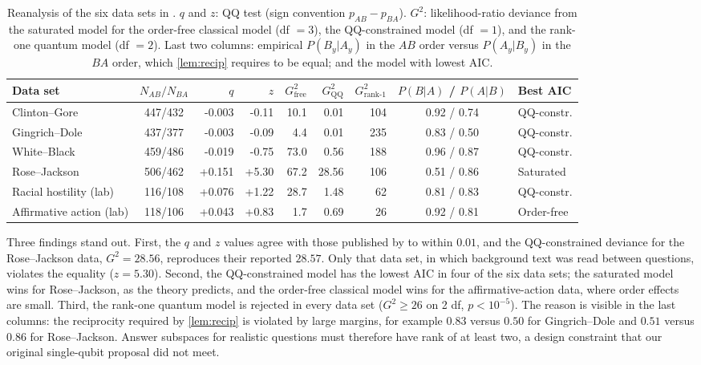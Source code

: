 \documentclass[11pt]{article}
\theoremstyle{definition}
\theoremstyle{remark}
\begin{document}
\begin{table}[t]
\centering
\caption{Reanalysis of the six data sets in \citet{wang2013}. $q$ and $z$: QQ test (sign convention $p_{AB}-p_{BA}$). $G^2$: likelihood-ratio deviance from the saturated model for the order-free classical model (df $=3$), the QQ-constrained model (df $=1$), and the rank-one quantum model (df $=2$). Last two columns: empirical $P(B_y|A_y)$ in the $AB$ order versus $P(A_y|B_y)$ in the $BA$ order, which \cref{lem:recip} requires to be equal; and the model with lowest AIC.}
\label{tab:qq}
\small
\begin{tabular}{lcrrrrrcl}
\toprule
Data set & $N_{AB}/N_{BA}$ & $q$ & $z$ & $G^2_{\text{free}}$ & $G^2_{\text{QQ}}$ & $G^2_{\text{rank-1}}$ & $P(B|A)$ / $P(A|B)$ & Best AIC\\
\midrule
Clinton--Gore & 447/432 & -0.003 & -0.11 & 10.1 & 0.01 & 104 & 0.92 / 0.74 & QQ-constr.\\
Gingrich--Dole & 437/377 & -0.003 & -0.09 & 4.4 & 0.01 & 235 & 0.83 / 0.50 & QQ-constr.\\
White--Black & 459/486 & -0.019 & -0.75 & 73.0 & 0.56 & 188 & 0.96 / 0.87 & QQ-constr.\\
Rose--Jackson & 506/462 & +0.151 & +5.30 & 67.2 & 28.56 & 106 & 0.51 / 0.86 & Saturated\\
Racial hostility (lab) & 116/108 & +0.076 & +1.22 & 28.7 & 1.48 & 62 & 0.81 / 0.83 & QQ-constr.\\
Affirmative action (lab) & 118/106 & +0.043 & +0.83 & 1.7 & 0.69 & 26 & 0.92 / 0.81 & Order-free\\
\bottomrule
\end{tabular}
\end{table}

Three findings stand out. First, the $q$ and $z$ values agree with those published by \citet{wang2013} to within $0.01$, and the QQ-constrained deviance for the Rose--Jackson data, $G^2=28.56$, reproduces their reported $28.57$. Only that data set, in which background text was read between questions, violates the equality ($z=5.30$). Second, the QQ-constrained model has the lowest AIC in four of the six data sets; the saturated model wins for Rose--Jackson, as the theory predicts, and the order-free classical model wins for the affirmative-action data, where order effects are small. Third, the rank-one quantum model is rejected in every data set ($G^2\ge 26$ on 2 df, $p<10^{-5}$). The reason is visible in the last columns: the reciprocity required by \cref{lem:recip} is violated by large margins, for example $0.83$ versus $0.50$ for Gingrich--Dole and $0.51$ versus $0.86$ for Rose--Jackson. Answer subspaces for realistic questions must therefore have rank of at least two, a design constraint that our original single-qubit proposal did not meet.
\end{document}
